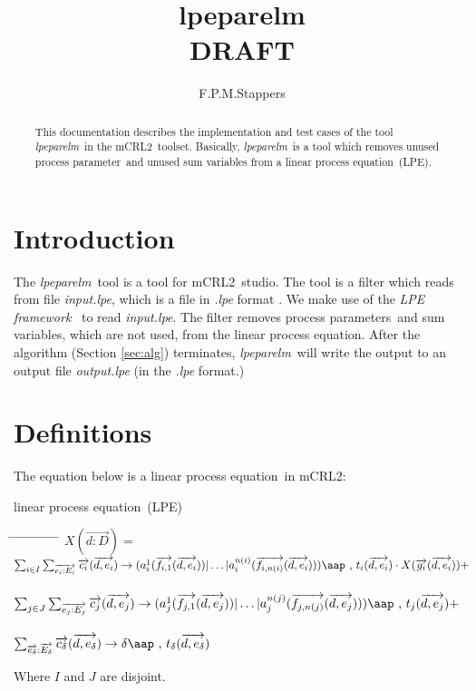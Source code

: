 \documentclass[a4paper,10pt]{article}
\title{lpeparelm\\DRAFT}
\author{F.P.M.Stappers}
\theoremstyle{plain}
\theoremstyle{definition}
\newcommand{\mcrl}{mCRL2}
\newcommand{\lpe}{linear process equation}
\newcommand{\tool}{\textit{lpeparelm}}
\newcommand{\ti}{\textit}
\newcommand{\ovr}{\overrightarrow}
\newcommand{\pp}{process parameter}
\newcommand{\pps}{process parameters}
\newcommand{\framework}{\textit{LPE framework} \cite{LPEframework}}
\newcommand{\tab}{\hspace*{5.mm} \= \hspace*{5.mm} \= \hspace*{5.mm} \= \hspace*{5.mm} \= \hspace*{5.mm} \= \hspace*{5.mm}  \= \hspace*{5.mm}  \= \hspace*{5.mm}  \= \hspace*{5.mm} \= \hspace*{5.mm} \= \hspace*{5.mm}  \= \hspace*{5.mm}  \= \hspace*{5.mm}\kill}
\newcommand{\at}[1]{\mbox{\aap ,} #1}
\begin{document}
\maketitle

\begin{abstract}
This documentation describes the implementation and test cases of the tool \tool\ in  the \mcrl\ toolset.
Basically, \tool\ is a tool which removes unused \pp\ and unused sum variables from a \lpe\ (LPE).
\end{abstract}

\tableofcontents

\section{Introduction}
The \tool\ tool is a tool for \mcrl\ studio. The tool is a
filter which reads from file \ti{input.lpe}, which is
a file in \ti{.lpe} format \cite{LPEformat}. We make use of the
\framework\ to read \ti{input.lpe}. The filter removes \pps\ and sum variables, which are not used, from the
\lpe. After the algorithm (Section \ref{sec:alg}) terminates, \tool\
will write the output to an output file \ti{output.lpe} (in the \ti{.lpe} format.)


\section{Definitions} \label{sec:def}

The equation below is a \lpe\ in \mcrl : 
\begin{defn}\lpe\ (LPE) \newline
\begin{tabbing}
\tab
$X (\ovr{d: D}) = $ \> \> \> $ \sum_{i \in I} \sum_{\ovr{e_i: E_i}} \ovr{c_i} ( \ovr{d, e_i }) \rightarrow 
(a_i^1 (\ovr{f_{i,1}}(\ovr{d,e_i})) \vert \ldots \vert a_i^{n(i)}(\ovr{f_{i,n(i)}}(\ovr{d,e_i}))) \at \text{ } t_i(\ovr{d,e_i})  \cdot X(\ovr{g_i}(\ovr{d,e_i})) +$ \\ \\
\> \> \> $ \sum_{j \in J} \sum_{\ovr{e_j: E_j}} \ovr{c_j} ( \ovr{d, e_j} ) \rightarrow 
(a_j^1 (\ovr{f_{j,1}}(\ovr{d,e_j})) \vert \ldots \vert a_j^{n(j)}(\ovr{f_{j,n(j)}}(\ovr{d,e_j}))) \at \text{ } t_j(\ovr{d,e_j}) + $ \\ \\
\> \> \> $\sum_{\ovr{e_\delta}:\ovr{E_\delta}} \ovr{c_\delta} ( \ovr{d, e_\delta}) \rightarrow 
\delta \at \text{ } t_\delta(\ovr{d,e_\delta})$ 
\end{tabbing}

Where $I$ and $J$ are disjoint.\\
\end{defn}
\end{document}
